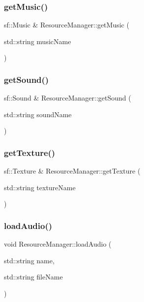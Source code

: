 \subsubsection{\texorpdfstring{getMusic()}{getMusic()}}
{\footnotesize\ttfamily sf\+::\+Music \& Resource\+Manager\+::get\+Music (\begin{DoxyParamCaption}\item[{std\+::string}]{music\+Name }\end{DoxyParamCaption})}

\mbox{\label{class_resource_manager_a329396127d82cab5247d91eefa2e5c8d}} 
\subsubsection{\texorpdfstring{getSound()}{getSound()}}
{\footnotesize\ttfamily sf\+::\+Sound \& Resource\+Manager\+::get\+Sound (\begin{DoxyParamCaption}\item[{std\+::string}]{sound\+Name }\end{DoxyParamCaption})}

\mbox{\label{class_resource_manager_abf59408987dd1e9a52bfbd917ad5fa80}} 
\subsubsection{\texorpdfstring{getTexture()}{getTexture()}}
{\footnotesize\ttfamily sf\+::\+Texture \& Resource\+Manager\+::get\+Texture (\begin{DoxyParamCaption}\item[{std\+::string}]{texture\+Name }\end{DoxyParamCaption})}

\mbox{\label{class_resource_manager_a44a1cbc17989de53902b433e15c05b7f}} 
\subsubsection{\texorpdfstring{loadAudio()}{loadAudio()}}
{\footnotesize\ttfamily void Resource\+Manager\+::load\+Audio (\begin{DoxyParamCaption}\item[{std\+::string}]{name,  }\item[{std\+::string}]{file\+Name }\end{DoxyParamCaption})}

